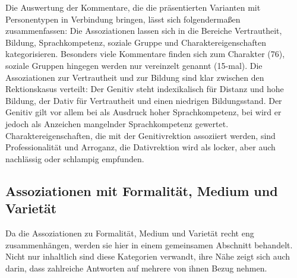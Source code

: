 Die Auswertung der Kommentare, die die präsentierten Varianten mit Personentypen in Verbindung bringen, lässt sich folgendermaßen zusammenfassen: 
Die Assoziationen lassen sich in die Bereiche \glqq Vertrautheit\grqq, \glqq Bildung\grqq, \glqq Sprachkompetenz\grqq, \glqq soziale Gruppe\grqq{} und \glqq Charaktereigenschaften\grqq{} kategorisieren. 
Besonders viele Kommentare finden sich zum Charakter (76), soziale Gruppen hingegen werden nur vereinzelt genannt (15-mal). 
Die Assoziationen zur Vertrautheit und zur Bildung sind klar zwischen den Rektionskasus verteilt: 
Der Genitiv steht indexikalisch für Distanz und hohe Bildung, der Dativ für Vertrautheit und einen niedrigen Bildungsstand. 
Der Genitiv gilt vor allem bei \waehrend{} als Ausdruck hoher Sprachkompetenz, bei \gegenueber{} wird er jedoch als Anzeichen mangelnder Sprachkompetenz gewertet. 
Charaktereigenschaften, die mit der Genitivrektion assoziiert werden, sind Professionalität und Arroganz, die Dativrektion wird als locker, aber auch nachlässig oder schlampig empfunden.
\subsection{Assoziationen mit Formalität, Medium und Varietät}
\label{sec:ErgAssFormMedVar}
Da die Assoziationen zu Formalität, Medium und Varietät recht eng zusammenhängen, werden sie hier in einem gemeinsamen Abschnitt behandelt. 
Nicht nur inhaltlich sind diese Kategorien verwandt, ihre Nähe zeigt sich auch darin, dass zahlreiche Antworten auf mehrere von ihnen Bezug nehmen. 


